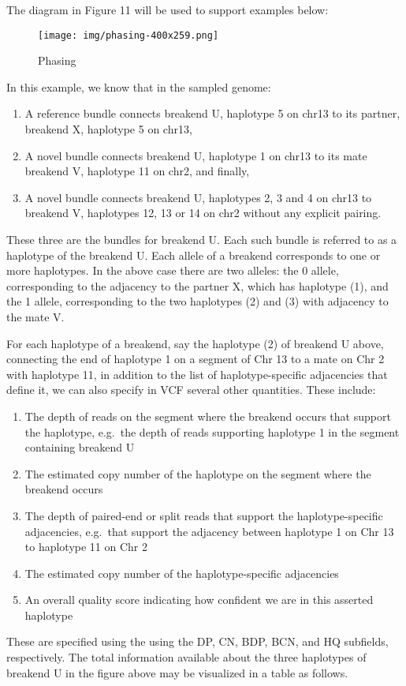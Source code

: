 \documentclass[8pt]{article}
\begin{document}
The diagram in Figure 11 will be used to support examples below:

\begin{figure}[ht]
\centering
\texttt{[image: img/phasing-400x259.png]}
\caption{Phasing}
\end{figure}

In this example, we know that in the sampled genome:

\begin{enumerate}
  \item A reference bundle connects breakend U, haplotype 5 on chr13 to its partner, breakend X, haplotype 5 on chr13,
  \item A novel bundle connects breakend U, haplotype 1 on chr13 to its mate breakend V, haplotype 11 on chr2, and finally,
  \item A novel bundle connects breakend U, haplotypes 2, 3 and 4 on chr13 to breakend V, haplotypes 12, 13 or 14 on chr2 without any explicit pairing.
\end{enumerate}

These three are the bundles for breakend U. Each such bundle is referred to as a haplotype of the breakend U.
Each allele of a breakend corresponds to one or more haplotypes.
In the above case there are two alleles: the 0 allele, corresponding to the adjacency to the partner X, which has haplotype (1), and the 1 allele, corresponding to the two haplotypes (2) and (3) with adjacency to the mate V.

For each haplotype of a breakend, say the haplotype (2) of breakend U above, connecting the end of haplotype 1 on a segment of Chr 13 to a mate on Chr 2 with haplotype 11, in addition to the list of haplotype-specific adjacencies that define it, we can also specify in VCF several other quantities.
These include:

\begin{enumerate}
  \item The depth of reads on the segment where the breakend occurs that support the haplotype, e.g.\ the depth of reads supporting haplotype 1 in the segment containing breakend U
  \item The estimated copy number of the haplotype on the segment where the breakend occurs
  \item The depth of paired-end or split reads that support the haplotype-specific adjacencies, e.g.\ that support the adjacency between haplotype 1 on Chr 13 to haplotype 11 on Chr 2
  \item The estimated copy number of the haplotype-specific adjacencies
  \item An overall quality score indicating how confident we are in this asserted haplotype
\end{enumerate}
These are specified using the using the DP, CN, BDP, BCN, and HQ subfields, respectively.
The total information available about the three haplotypes of breakend U in the figure above may be visualized in a table as follows.
\end{document}
